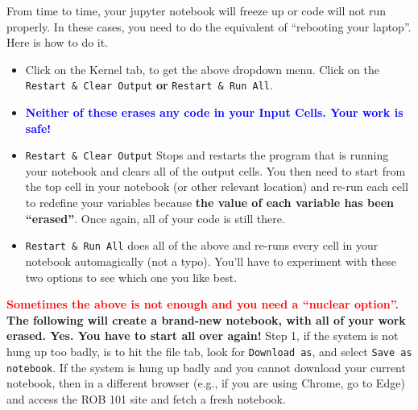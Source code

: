 From time to time, your jupyter notebook will freeze up or code will not run properly. In these cases, you need to do the equivalent of ``rebooting your laptop''. Here is how to do it. \\


\setlength{\fboxrule}{3pt}%
	\centerline{ %
}


\begin{itemize}
    \item Click on the Kernel tab, to get the above dropdown menu. Click on the \texttt{Restart \& Clear Output} \textbf{or} \texttt{Restart \& Run All}.
    \item \textcolor{blue}{\bf Neither of these erases any code in your Input Cells. Your work is safe! }
    \item \texttt{Restart \& Clear Output} Stops and restarts the program that is running your notebook and clears all of the output cells. You then need to start from the top cell in your notebook (or other relevant location) and re-run each cell to redefine your variables because \textbf{the value of each variable has been ``erased''}. Once again, all of your code is still there. 
    \item \texttt{Restart \& Run All} does all of the above and re-runs every cell in your notebook automagically (not a typo). You'll have to experiment with these two options to see which one you like best. 
\end{itemize}

\textcolor{red}{\bf Sometimes the above is not enough and you need a ``nuclear option''.} \textbf{The following will create a brand-new notebook, with all of your work erased. Yes. You have to start all over again!} Step 1, if the system is not hung up too badly,  is to hit the file tab, look for \texttt{Download as}, and select \texttt{Save as notebook}. If the system is hung up badly and you cannot download your current notebook, then in a different browser (e.g., if you are using Chrome, go to Edge) and access the ROB 101 site and fetch a fresh notebook.\\

\setlength{\fboxrule}{3pt}%
	\centerline{ }
\vspace*{.2cm}

